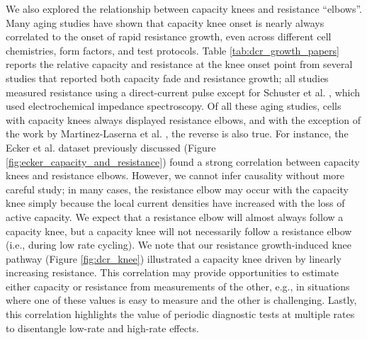 \documentclass[journal=jpclcd,manuscript=article]{achemso}
\begin{document}
We also explored the relationship between capacity knees and resistance ``elbows''.
Many aging studies have shown that capacity knee onset is nearly always correlated to the onset of rapid resistance growth, even across different cell chemistries, form factors, and test protocols. Table \ref{tab:dcr_growth_papers} reports the relative capacity and resistance at the knee onset point from several studies that reported both capacity fade and resistance growth; all studies measured resistance using a direct-current pulse except for Schuster et al. \cite{schuster_nonlinear_2015}{}, which used electrochemical impedance spectroscopy. Of all these aging studies, cells with capacity knees always displayed resistance elbows, and with the exception of the work by Martinez-Laserna et al. \cite{martinez-laserna_technical_2018}{}, the reverse is also true. For instance, the Ecker et al.\cite{ecker_calendar_2014} dataset previously discussed (Figure \ref{fig:ecker_capacity_and_resistance}) found a strong correlation between capacity knees and resistance elbows.
However, we cannot infer causality without more careful study; in many cases, the resistance elbow may occur with the capacity knee simply because the local current densities have increased with the loss of active capacity.
We expect that a resistance elbow will almost always follow a capacity knee, but a capacity knee will not necessarily follow a resistance elbow (i.e., during low rate cycling).
We note that our resistance growth-induced knee pathway (Figure \ref{fig:dcr_knee}) illustrated a capacity knee driven by linearly increasing resistance.
This correlation may provide opportunities to estimate either capacity or resistance from measurements of the other, e.g., in situations where one of these values is easy to measure and the other is challenging.
Lastly, this correlation highlights the value of periodic diagnostic tests at multiple rates to disentangle low-rate and high-rate effects.
\end{document}
